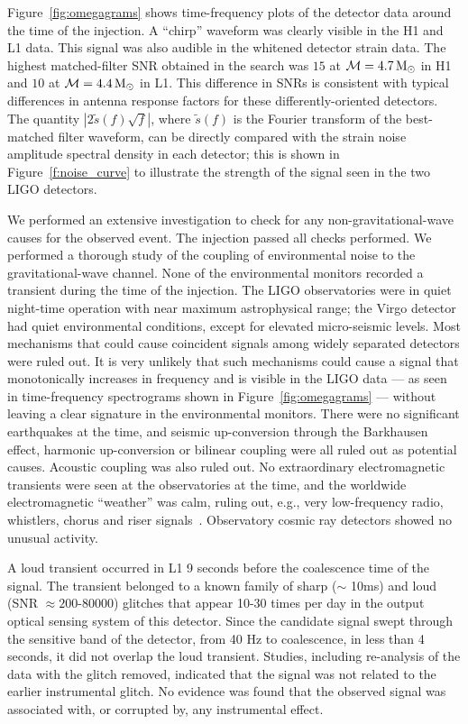 Figure~\ref{fig:omegagrams} shows time-frequency plots of the detector data
around the time of the injection. A ``chirp'' waveform was clearly visible in
the H1 and L1 data. This signal was also audible in the whitened detector
strain data. The highest matched-filter SNR obtained in the search was $15$ at
$\mathcal{M} = 4.7\,\mathrm{M_\odot}$ in H1 and $10$ at $\mathcal{M} = 4.4\,\mathrm{M_\odot}$ in L1.
This difference in SNRs is consistent with typical differences in antenna
response factors for these differently-oriented detectors.  The quantity
$|2\tilde{s}(f)\sqrt{f}|$, where $\tilde{s}(f)$ is the Fourier transform of the
best-matched filter waveform, can be directly compared with the strain noise
amplitude spectral density in each detector; this is shown in
Figure~\ref{f:noise_curve} to illustrate the strength of the signal seen in the
two LIGO detectors.

We performed an extensive investigation to check for any
non-gravitational-wave causes for the observed event. The injection
passed all checks performed. We performed a thorough study of the
coupling of environmental noise to the gravitational-wave channel. None
of the environmental monitors recorded a transient during the time of
the injection.  The LIGO observatories were in quiet night-time
operation with near maximum astrophysical range; the Virgo detector
had quiet environmental conditions, except for elevated micro-seismic
levels. Most mechanisms that could cause coincident signals among widely
separated detectors were ruled out. It is very unlikely that such mechanisms could
cause a signal that monotonically increases in frequency and is visible
in the LIGO data --- as seen in time-frequency spectrograms shown in
Figure~\ref{fig:omegagrams} --- without leaving a clear signature in the
environmental monitors. There were no significant earthquakes at the
time, and seismic up-conversion through the Barkhausen effect, harmonic
up-conversion or bilinear coupling were all ruled out as potential
causes. Acoustic coupling was also ruled out. No extraordinary
electromagnetic transients were seen at the observatories at the time,
and the worldwide electromagnetic ``weather'' was calm, ruling out, e.g.,
very low-frequency radio, whistlers, chorus and riser
signals~\cite{Singh:2004}.  Observatory cosmic ray detectors showed no
unusual activity.

A loud transient occurred in L1 9 seconds before the coalescence time of the
signal. The transient belonged to a known family of sharp ($\sim$ 10ms) and
loud (SNR $\approx 200$-$80000$) glitches that appear 10-30 times per day in
the output optical sensing system of this detector. Since the candidate signal
swept through the sensitive band of the detector, from 40 Hz to coalescence,
in less than 4 seconds, it did not overlap the loud transient.  Studies,
including re-analysis of the data with the glitch removed, indicated that the
signal was not related to the earlier instrumental glitch.  No evidence was
found that the observed signal was associated with, or corrupted by, any
instrumental effect.


